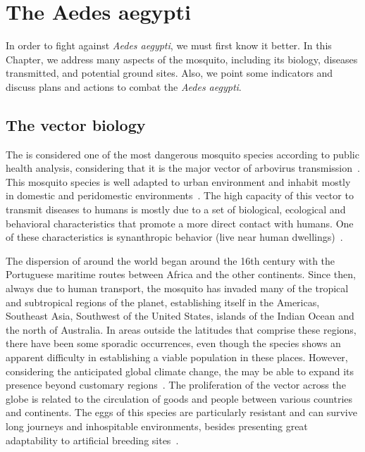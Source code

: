 \chapter{The \textbf{Aedes aegypti}}
\label{chap:mosquito}
%
In order to fight against \textit{Aedes aegypti}, we must first know it better.
In this Chapter, we address many aspects of the mosquito, including its
biology, diseases transmitted, and potential ground sites.
Also, we point some indicators and discuss plans and actions to combat the \textit{Aedes aegypti}.


\section{The vector biology}\label{sec:bio}
%
The \Aedes is considered one of the most dangerous mosquito species according to public health analysis, considering that it is the major vector of arbovirus transmission~\cite{ruckert2017}.
This mosquito species is well adapted to urban environment and inhabit mostly in domestic and peridomestic environments~\cite{Jansen2010}.
The high capacity of this vector to transmit diseases to humans is mostly due to a set of biological, ecological and behavioral characteristics that promote a more direct contact with humans.
One of these characteristics is synanthropic behavior (live near human dwellings)~\cite{Jansen2010}.

The dispersion of \Aedes around the world began around the 16th century with the Portuguese maritime routes between Africa and the other continents.
Since then, always due to human transport, the mosquito has invaded many of the tropical and subtropical regions of the planet, establishing itself in the Americas, Southeast Asia, Southwest of the United States, islands of the Indian Ocean and the north of Australia.
In areas outside the latitudes that comprise these regions, there have been some sporadic occurrences, even though the species shows an apparent difficulty in establishing a viable population in these places. However, considering the anticipated global climate change, the \Aedes may be able to expand its presence beyond customary regions~\cite{liu2016climate}.
The proliferation of the vector across the globe is related to the circulation of goods and people between various countries and continents.
The eggs of this species are particularly resistant and can survive long journeys and inhospitable environments, besides presenting great adaptability to artificial breeding sites~\cite{liu2016climate}.


